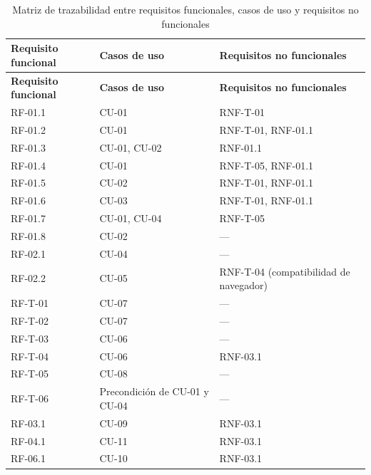 \begin{longtable}{>{\raggedright\arraybackslash}p{3.2cm} >{\raggedright\arraybackslash}p{5.0cm} >{\raggedright\arraybackslash}p{6.4cm}}
  \caption{Matriz de trazabilidad entre requisitos funcionales, casos de uso y requisitos no funcionales}\label{tab:trazabilidad}\\
  \toprule
  \textbf{Requisito funcional} & \textbf{Casos de uso} & \textbf{Requisitos no funcionales} \\
  \midrule
  \endfirsthead
  \toprule
  \textbf{Requisito funcional} & \textbf{Casos de uso} & \textbf{Requisitos no funcionales} \\
  \midrule
  \endhead
  RF-01.1 & CU-01 & RNF-T-01 \\
  RF-01.2 & CU-01 & RNF-T-01, RNF-01.1 \\
  RF-01.3 & CU-01, CU-02 & RNF-01.1 \\
  RF-01.4 & CU-01 & RNF-T-05, RNF-01.1 \\
  RF-01.5 & CU-02 & RNF-T-01, RNF-01.1 \\
  RF-01.6 & CU-03 & RNF-T-01, RNF-01.1 \\
  RF-01.7 & CU-01, CU-04 & RNF-T-05 \\
  RF-01.8 & CU-02 & --- \\
  RF-02.1 & CU-04 & --- \\
  RF-02.2 & CU-05 & RNF-T-04 (compatibilidad de navegador) \\
  RF-T-01 & CU-07 & --- \\
  RF-T-02 & CU-07 & --- \\
  RF-T-03 & CU-06 & --- \\
  RF-T-04 & CU-06 & RNF-03.1 \\
  RF-T-05 & CU-08 & --- \\
  RF-T-06 & Precondición de CU-01 y CU-04 & --- \\
  \midrule
  RF-03.1 & CU-09 & RNF-03.1 \\
  RF-04.1 & CU-11 & RNF-03.1 \\
  RF-06.1 & CU-10 & RNF-03.1 \\
  \bottomrule
\end{longtable}

